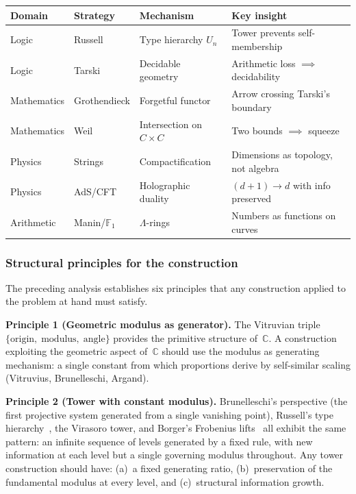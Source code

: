 \begin{center}
\small
\begin{tabular}{@{}llll@{}}
\toprule
Domain & Strategy & Mechanism & Key insight \\
\midrule
Logic & Russell & Type hierarchy $U_n$
  & Tower prevents self-membership \\
Logic & Tarski & Decidable geometry
  & Arithmetic loss $\implies$ decidability \\
Mathematics & Grothendieck & Forgetful functor
  & Arrow crossing Tarski's boundary \\
Mathematics & Weil & Intersection on $C\!\times\!C$
  & Two bounds $\implies$ squeeze \\
Physics & Strings & Compactification
  & Dimensions as topology, not algebra \\
Physics & AdS/CFT & Holographic duality
  & $(d{+}1)\!\to\!d$ with info preserved \\
Arithmetic & Manin/$\mathbb{F}_1$ & $\Lambda$-rings
  & Numbers as functions on curves \\
\bottomrule
\end{tabular}
\end{center}


\subsubsection{Structural principles for the construction}

The preceding analysis establishes six
principles that any construction applied to the problem at hand
must satisfy.

\textbf{Principle 1 (Geometric modulus as generator).}
The Vitruvian triple
$\{\text{origin},\allowbreak\;\text{modulus},\allowbreak\;\text{angle}\}$
provides the primitive structure of~$\mathbb{C}$.  A construction
exploiting the geometric aspect of~$\mathbb{C}$ should use the
modulus as generating mechanism: a single constant from which
proportions derive by self-similar scaling (Vitruvius,
Brunelleschi, Argand).

\textbf{Principle 2 (Tower with constant modulus).}
Brunelleschi's perspective (the first projective system generated from
a single vanishing point), Russell's type
hierarchy~\cite{russell08,martinlof75}, the Virasoro tower,
and Borger's Frobenius lifts~\cite{borger09} all exhibit the same pattern: an infinite
sequence of levels generated by a fixed rule, with new information at
each level but a single governing modulus throughout.  Any tower
construction should have: (a)~a fixed generating ratio, (b)~preservation
of the fundamental modulus at every level, and (c)~structural
information growth.


